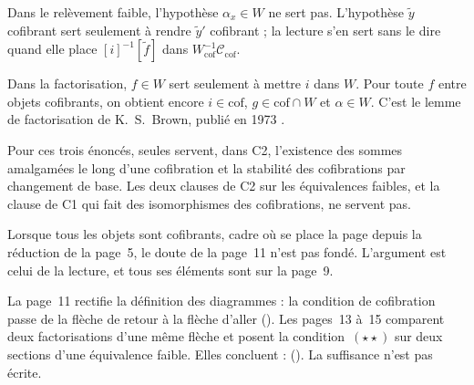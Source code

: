 \begin{remarque}
Dans le relèvement faible, l'hypothèse $\alpha_x \in W$ ne sert pas. L'hypothèse $\widetilde y$ cofibrant sert seulement à rendre $\widetilde y'$ cofibrant ; la lecture s'en sert sans le dire quand elle place $[i]^{-1}[\widetilde f]$ dans $W_{\mathrm{cof}}^{-1}\mathcal C_{\mathrm{cof}}$.
\end{remarque}

\begin{remarque}
Dans la factorisation, $f \in W$ sert seulement à mettre $i$ dans $W$. Pour toute $f$ entre objets cofibrants, on obtient encore $i \in \mathrm{cof}$, $g \in \mathrm{cof} \cap W$ et $\alpha \in W$. C'est le lemme de factorisation de K.~S.~Brown, publié en 1973 \cite{brown1973}.
\end{remarque}

\begin{remarque}
Pour ces trois énoncés, seules servent, dans C2, l'existence des sommes amalgamées le long d'une cofibration et la stabilité des cofibrations par changement de base. Les deux clauses de C2 sur les équivalences faibles, et la clause de C1 qui fait des isomorphismes des cofibrations, ne servent pas.
\end{remarque}

\begin{remarque}
Lorsque tous les objets sont cofibrants, cadre où se place la page depuis la réduction de la page~5, le doute de la page~11 n'est pas fondé. L'argument est celui de la lecture, et tous ses éléments sont sur la page~9.
\end{remarque}

La page~11 rectifie la définition des diagrammes : la condition de cofibration passe de la flèche de retour à la flèche d'aller (). Les pages~13 à~15 comparent deux factorisations d'une même flèche et posent la condition~$(\star\star)$ sur deux sections d'une équivalence faible. Elles concluent :  (). La suffisance n'est pas écrite.

